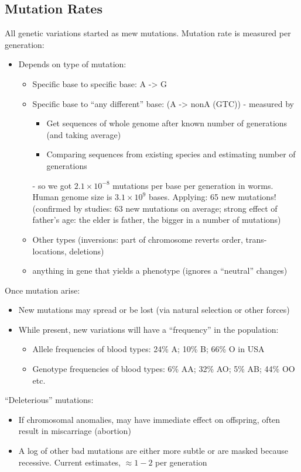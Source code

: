 \documentclass{scrartcl}
\begin{document}
\subsection{Mutation Rates}
\label{sec:4-3}
All genetic variations started as mew mutations. Mutation rate is measured per generation:
\begin{itemize}
\item Depends on type of mutation:
  \begin{itemize}
  \item Specific base to specific base: A -> G
  \item Specific base to ``any different'' base: (A -> nonA (GTC)) - measured by
    \begin{itemize}
    \item Get sequences of whole genome after known number of generations (and taking average)
    \item Comparing sequences from existing species and estimating number of generations
    \end{itemize}
    - so we got $2.1 \times 10^{-8}$ mutations per base per generation in worms. Human genome size is $3.1 \times 10^9$ bases.
    Applying: 65 new mutations! (confirmed by studies: 63 new mutations on average; strong effect of father's age: the elder is father, the bigger in a number of mutations)
  \item Other types (inversions: part of chromosome reverts order, trans-locations, deletions)
  \item anything in gene that yields a phenotype (ignores a ``neutral'' changes)
  \end{itemize}
\end{itemize}
Once mutation arise:
\begin{itemize}
\item New mutations may spread or be lost (via natural selection or other forces)
\item While present, new variations will have a ``frequency'' in the population:
  \begin{itemize}
  \item Allele frequencies of blood types: 24\% A; 10\% B; 66\% O in USA
  \item Genotype frequencies of blood types: 6\% AA; 32\% AO; 5\% AB; 44\% OO etc.
  \end{itemize}
\end{itemize}
``Deleterious'' mutations:
\begin{itemize}
\item If chromosomal anomalies, may have immediate effect on offspring, often result in miscarriage (abortion)
\item A log of other bad mutations are either more subtle or are masked because recessive.
  Current estimates, $\approx 1-2$ per generation
\end{itemize}
\end{document}
